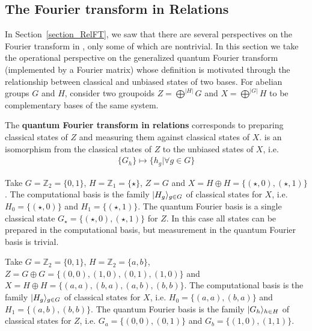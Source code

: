 \subsection{The Fourier transform in Relations}
\label{sec:RelFT}

In Section~\ref{section_RelFT}, we saw that there are several perspectives on the Fourier transform in , only some of which are nontrivial. In this section we take the operational perspective on the generalized quantum Fourier transform (implemented by a Fourier matrix) whose definition is motivated through the relationship between classical and unbiased states of two bases.  For abelian groups $G$ and $H$, consider two groupoids $Z=\bigoplus^{|H|}G$ and $X=\bigoplus^{|G|}H$ to be complementary bases of the same system.

\begin{defn}
\label{def:FTRel}
The \textbf{quantum Fourier transform in relations} corresponds to preparing classical states of $Z$ and measuring them against classical states of $X$.
is an isomorphism from the classical states of $Z$ to the unbiased states of $X$, i.e.
\begin{align*}
\{G_h\}\mapsto \{h_g|\forall g\in G\}
\end{align*}
\end{defn}

\begin{example}
Take $G=\mathbb{Z}_2=\{0,1\}$, $H=\mathbb{Z}_1=\{\star\}$, $Z = G$ and $X=H\oplus H = \{ (\star,0),(\star,1) \}$. The computational basis is the family $| H_g \rangle_{g\in G}$ of classical states for $X$, i.e. $H_0 = \{(\star,0)\}$ and $H_1 = \{(\star,1)\}$. The quantum Fourier basis is a single classical state $G_\star = \{(\star,0), (\star,1)\}$ for $Z$. In this case all states can be prepared in the computational basis, but  measurement in the quantum Fourier basis is trivial.
\end{example}

\begin{example}
Take $G=\mathbb{Z}_2=\{0,1\}$, $H=\mathbb{Z}_2=\{a,b\}$, $Z = G \oplus G = \{ (0,0),(1,0),(0,1),(1,0)\}$ and $X= H \oplus H = \{ (a,a), (b,a), (a,b), (b,b) \}$. The computational basis is the family $| H_g \rangle_{g \in G}$ of classical states for $X$, i.e. $H_0 = \{(a,a),(b,a)\}$ and $H_1 = \{(a,b),(b,b)\}$. The quantum Fourier basis is the family $| G_h \rangle_{h\in H}$ of classical states for $Z$, i.e. $G_a = \{(0,0),(0,1)\}$ and $G_b = \{(1,0),(1,1)\}$.
\end{example}

